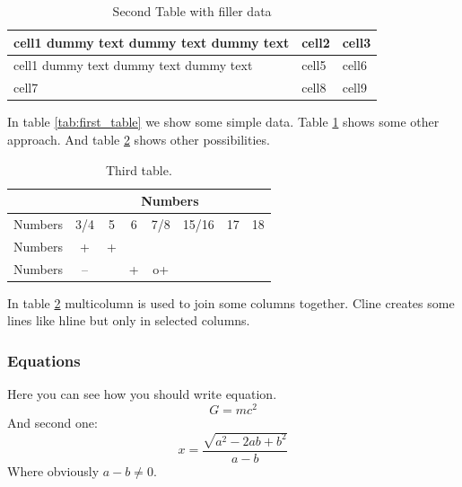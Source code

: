 \begin{table}[h] %
\centering
\begin{tabular}{ | m{5em} | m{1cm}| m{1cm} | } 
  \hline
  cell1 dummy text dummy text dummy text& cell2 & cell3 \\ 
  \hline
  cell1 dummy text dummy text dummy text & cell5 & cell6 \\ 
  \hline
  cell7 & cell8 & cell9 \\ 
  \hline
\end{tabular}
\caption[Second table.]{Second Table with filler data}
\label{tab:second_table}
\end{table}

In table \ref{tab:first_table} we show some simple data. Table \ref{tab:second_table} shows some other approach. And table \ref{tab:third_table} shows other possibilities. %

\begin{table}[!htb]
\centering
\begin{tabular}{|c|c|c|c|c|c|c|c|}
\cline{2-8}
\multicolumn{1}{l|}{} & \multicolumn{7}{|c|}{Numbers} \\ \hline
Numbers & 3/4 & 5 & 6 & 7/8 & 15/16 & 17 & 18 \\ \hline
Numbers & + & + & & & & & \\ \hline
Numbers & -- & & + & o+ & & & \\ \hline
\end{tabular}
\caption{Third table.}
\label{tab:third_table}
\end{table}

In table \ref{tab:third_table} multicolumn is used to join some columns together. Cline creates some lines like hline but only in selected columns.

\subsubsection{Equations}
\label{label:equations_title}

Here you can see how you should write equation.
\begin{equation} %
    G = mc^2
    \label{eq:equation_one}
\end{equation}
And second one:
\begin{equation}
    x = \frac{\sqrt{a^2-2ab+b^2}}{a-b}
    \label{eq:equation_two}
\end{equation}
Where obviously $a - b \ne 0$. %

